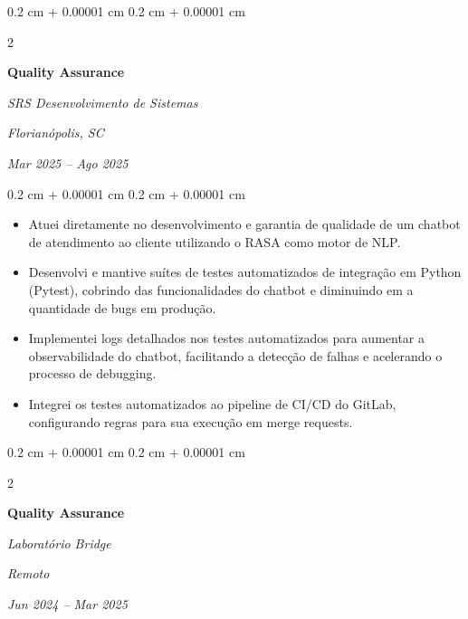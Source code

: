\documentclass[10pt, letterpaper]{article}
\newenvironment{highlights}{
    \begin{itemize}[
        topsep=0.10 cm,
        parsep=0.10 cm,
        partopsep=0pt,
        itemsep=0pt,
        leftmargin=0.4 cm + 10pt
    ]
}{
    \end{itemize}
} %
\newenvironment{onecolentry}{
    \begin{adjustwidth}{
        0.2 cm + 0.00001 cm
    }{
        0.2 cm + 0.00001 cm
    }
}{
    \end{adjustwidth}
} %
\newenvironment{twocolentry}[2][]{
    \onecolentry
    \def\secondColumn{#2}
    \setcolumnwidth{\fill, 4.5 cm}
    \begin{paracol}{2}
}{
    \switchcolumn \raggedleft \secondColumn
    \end{paracol}
    \endonecolentry
} %
\begin{document}
        \vspace{0.2 cm}

        \begin{twocolentry}{
        \textit{Florianópolis, SC}    
            
        \textit{Mar 2025 – Ago 2025}}
            \textbf{Quality Assurance}
            
            \textit{SRS Desenvolvimento de Sistemas}
        \end{twocolentry}

        \vspace{0.10 cm}
        \begin{onecolentry}
            \begin{highlights}
                \item Atuei diretamente no desenvolvimento e garantia de qualidade de um chatbot de atendimento ao cliente utilizando o RASA como motor de NLP.
                \item Desenvolvi e mantive suítes de testes automatizados de integração em Python (Pytest), cobrindo  das funcionalidades do chatbot e diminuindo em  a quantidade de bugs em produção. 
                \item Implementei logs detalhados nos testes automatizados para aumentar a observabilidade do chatbot, facilitando a detecção de falhas e acelerando o processo de debugging.
                \item Integrei os testes automatizados ao pipeline de CI/CD do GitLab, configurando regras para sua execução em merge requests.
            \end{highlights}
        \end{onecolentry}


        \vspace{0.2 cm}

        \begin{twocolentry}{
        \textit{Remoto}    
            
        \textit{Jun 2024 – Mar 2025}}
            \textbf{Quality Assurance}
            
            \textit{Laboratório Bridge}
        \end{twocolentry}
\end{document}
